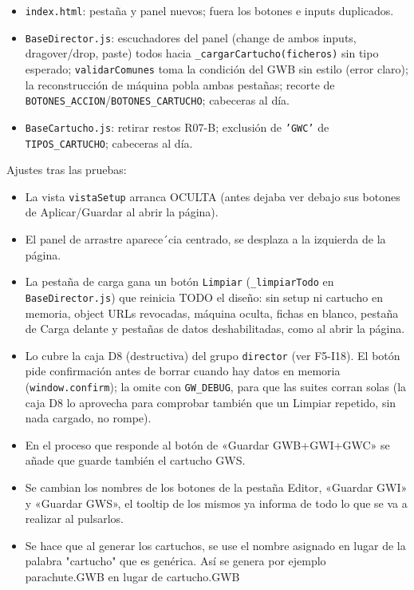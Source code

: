 \begin{itemize}
	\item \texttt{index.html}: pestaña y panel nuevos; fuera los botones e
	inputs duplicados.
	\item \texttt{BaseDirector.js}: escuchadores del panel (change de ambos
	inputs, dragover/drop, paste) todos hacia
	\texttt{\_cargarCartucho(ficheros)} sin tipo esperado;
	\texttt{validarComunes} toma la condición del GWB sin estilo (error
	claro); la reconstrucción de máquina pobla ambas pestañas; recorte de
	\texttt{BOTONES\_ACCION}/\texttt{BOTONES\_CARTUCHO}; cabeceras al día.
	\item \texttt{BaseCartucho.js}: retirar restos R07-B; exclusión de
	\texttt{'GWC'} de \texttt{TIPOS\_CARTUCHO}; cabeceras al día.
\end{itemize}

Ajustes tras las pruebas: 
\begin{itemize}
	\item La vista \texttt{vistaSetup} arranca OCULTA (antes dejaba ver debajo sus botones de Aplicar/Guardar al abrir la página).
	\item El panel de arrastre aparece´cia centrado, se desplaza a la  izquierda de la página.
	\item La pestaña de carga gana un botón \texttt{Limpiar} (\texttt{\_limpiarTodo} en \texttt{BaseDirector.js}) que reinicia TODO el diseño: sin setup ni cartucho en memoria, object URLs revocadas, máquina oculta, fichas en blanco, pestaña de Carga delante y pestañas de datos deshabilitadas, como al abrir la página.
	\item Lo cubre la caja D8 (destructiva) del grupo \texttt{director} (ver F5-I18). El botón pide confirmación antes de borrar cuando hay datos en memoria (\texttt{window.confirm}); la omite con \texttt{GW\_DEBUG}, para que las suites corran solas (la caja D8 lo aprovecha para comprobar también que un Limpiar repetido, sin nada cargado, no rompe).
	\item En el proceso que responde al botón de «Guardar GWB+GWI+GWC» se añade que  guarde también el cartucho GWS.
	\item Se cambian los nombres de los botones de la pestaña Editor, «Guardar GWI» y «Guardar GWS», el tooltip de los mismos ya informa de todo lo que se va a realizar al pulsarlos.
	\item Se hace que al generar los cartuchos, se use el nombre asignado en lugar de la palabra "cartucho" que es genérica. Así se genera por ejemplo parachute.GWB en lugar de cartucho.GWB
\end{itemize}

